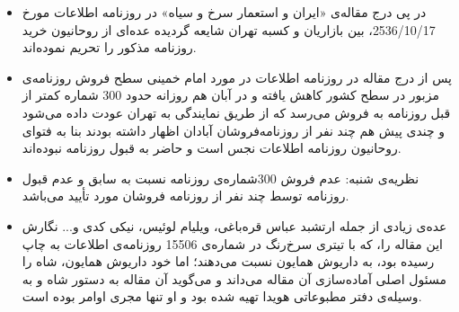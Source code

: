 \documentclass{article}
\begin{document}
\begin{itemize}
\item
در پی درج مقاله‌ی «ايران و استعمار سرخ و سياه» در روزنامه اطلاعات مورخ 2536/10/17، بين بازاريان و كسبه تهران شايعه گرديده عده‌ای از روحانيون خريد روزنامه مذكور را تحريم نموده‌اند.
\item
پس از درج مقاله در روزنامه اطلاعات در مورد امام خمينی سطح فروش روزنامه‌ی مزبور در سطح كشور كاهش يافته و در آبان هم روزانه حدود 300 شماره كمتر از قبل روزنامه به فروش می‌رسد كه از طريق نمايندگی به تهران عودت داده می‌شود و چندی پيش هم چند نفر از روزنامه‌فروشان آبادان اظهار داشته بودند بنا به فتوای روحانيون روزنامه اطلاعات نجس است و حاضر به قبول روزنامه نبوده‌اند.
\item
نظریه‌ی شنبه: عدم فروش 300شماره‌ی روزنامه نسبت به سابق و عدم قبول روزنامه توسط چند نفر از روزنامه فروشان مورد تأیید می‌باشد.
\item
عده‌ی زیادی از جمله ارتشبد عباس قره‌باغی، ویلیام لوئیس، نیکی کدی و... نگارش این مقاله را، که با تیتری سرخ‌رنگ در شماره‌ی 15506 روزنامه‌ی اطلاعات به چاپ رسیده بود، به داریوش همایون نسبت می‌دهند؛ اما خود داریوش همایون، شاه را مسئول اصلی آماده‌سازی آن مقاله می‌داند و می‌گوید آن مقاله به دستور شاه و به وسیله‌ی دفتر مطبوعاتی هویدا تهیه شده بود و او تنها مجری اوامر بوده است.
\end{itemize}
\end{document}
